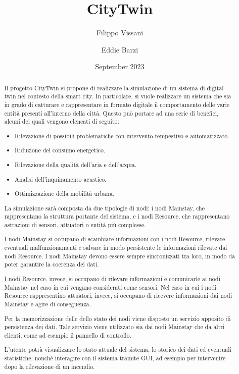\documentclass{scrartcl}
\title{\LARGE
    CityTwin
}
\author{
    Filippo Vissani \\ \emailaddr{filippo.vissani@studio.unibo.it}
    \and 
    Eddie Barzi \\ \emailaddr{eddie.barzi@studio.unibo.it}
}
\date{September 2023}
\begin{document}
\maketitle

\begin{abstract}

    Il progetto CityTwin si propone di realizzare la simulazione di un sistema di digital twin nel contesto della smart city. In particolare, si vuole realizzare un sistema che sia in grado di catturare e rappresentare in formato digitale il comportamento delle varie entità presenti all'interno della città. Questo può portare ad una serie di benefici, alcuni dei quali vengono elencati di seguito:

    \begin{itemize}
        \item Rilevazione di possibili problematiche con intervento tempestivo e automatizzato.
        \item Riduzione del consumo energetico.
        \item Rilevazione della qualità dell'aria e dell'acqua.
        \item Analisi dell'inquinamento acustico.
        \item Ottimizzazione della mobilità urbana.
    \end{itemize}

    La simulazione sarà composta da due tipologie di nodi: i nodi Mainstay, che rappresentano la struttura portante del sistema, e i nodi Resource, che rappresentano astrazioni di sensori, attuatori o entità più complesse.

    I nodi Mainstay si occupano di scambiare informazioni con i nodi Resource, rilevare eventuali malfunzionamenti e salvare in modo persistente le informazioni rilevate dai nodi Resource. I nodi Mainstay devono essere sempre sincronizzati tra loro, in modo da poter garantire la coerenza dei dati.

    I nodi Resource, invece, si occupano di rilevare informazioni e comunicarle ai nodi Mainstay nel caso in cui vengano considerati come sensori. Nel caso in cui i nodi Resource rappresentino attuatori, invece, si occupano di ricevere informazioni dai nodi Mainstay e agire di conseguenza.

    Per la memorizzazione delle dello stato dei nodi viene disposto un servizio apposito di persistenza dei dati. Tale servizio viene utilizzato sia dai nodi Mainstay che da altri clienti, come ad esempio il pannello di controllo.

    L'utente potrà visualizzare lo stato attuale del sistema, lo storico dei dati ed eventuali statistiche, nonché interagire con il sistema tramite GUI, ad esempio per intervenire dopo la rilevazione di un incendio.

\end{abstract}
\end{document}

